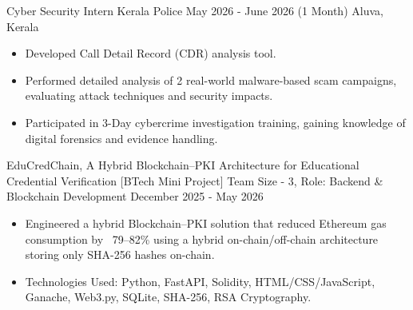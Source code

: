 \documentclass[10pt,a4paper]{altacv}
\begin{document}


\begin{fullwidth}
\makecvheader
\end{fullwidth}




\cvevent
    {Cyber Security Intern}
    {Kerala Police}
    {May 2026 - June 2026 (1 Month)}
    {Aluva, Kerala}
    \begin{itemize}
        \item Developed Call Detail Record (CDR) analysis tool.
        \item Performed detailed analysis of 2 real-world malware-based scam campaigns, evaluating attack techniques and security impacts.
        \item Participated in 3-Day cybercrime investigation training, gaining knowledge of digital forensics and evidence handling.

    \end{itemize}



\cvevent
    {EduCredChain, A Hybrid Blockchain–PKI Architecture for Educational Credential Verification [BTech Mini Project]}
    {Team Size - 3, Role: Backend \& Blockchain Development}
    {December 2025 - May 2026}
    {}
    \begin{itemize}
        \item Engineered a hybrid Blockchain–PKI solution that reduced Ethereum gas consumption by ~79–82\% using a hybrid on-chain/off-chain architecture storing only SHA-256 hashes on-chain.
        \item Technologies Used: Python, FastAPI, Solidity, HTML/CSS/JavaScript, Ganache, Web3.py, SQLite, SHA-256, RSA Cryptography.
    \end{itemize}
\end{document}
